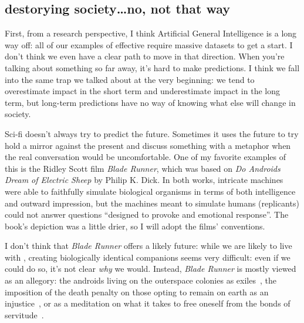 \subsection{ destorying society\dots no, not that way}

First, from a research perspective, I think Artificial General
Intelligence is a long way off: all of our examples of effective
 require massive datasets to get a start. I don't think we
even have a clear path to move in that direction.
%
When you're talking about something so far away, it's hard to
make predictions.
%
I think we fall into the same trap we talked about
at the very beginning: we tend to overestimate impact in the short
term and underestimate impact in the long term, but long-term
predictions have no way of knowing what else will change in society.

Sci-fi doesn't always try to predict the future.
%
Sometimes it uses the future to try hold a mirror against the present
and discuss something with a metaphor when the real conversation would
be uncomfortable.
%
One of my favorite examples of this is the Ridley Scott film
\textit{Blade Runner}, which was based on \textit{Do Androids Dream of
  Electric Sheep} by Philip K. Dick.
%
In both works, intricate machines were able to faithfully simulate
biological organisms in terms of both intelligence and outward
impression, but the machines meant to simulate humans (replicants)
could not answer questions ``designed to provoke and emotional
response''.
%
The book's depiction was a little drier, so I will adopt the films'
conventions.

I don't think that \textit{Blade Runner} offers a likely future: while
we are likely to live with , creating biologically identical
 companions seems very difficult: even if we could do so, it's
not clear \emph{why} we would.
%
Instead, \textit{Blade Runner} is mostly viewed as an allegory: the
androids living on the outerspace colonies as
exiles~\cite{}, %
the imposition of the death penalty on those opting to remain on earth
as an
injustice~\cite{}, %
or as a meditation on what it takes to free oneself from the bonds of
servitude~\cite{}.  %

